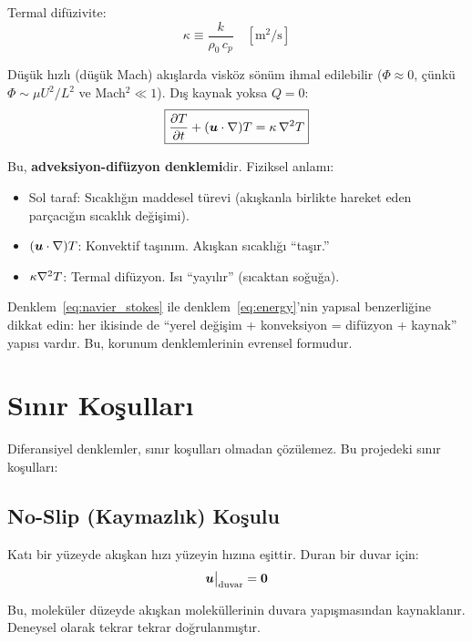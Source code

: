 Termal difüzivite:
\begin{equation}
    \kappa \equiv \frac{k}{\rho_0 \, c_p} \quad [\text{m}^2/\text{s}]
    \label{eq:thermal_diffusivity}
\end{equation}

Düşük hızlı (düşük Mach) akışlarda visköz sönüm ihmal edilebilir ($\Phi \approx 0$, çünkü $\Phi \sim \mu U^2/L^2$ ve Mach$^2 \ll 1$). Dış kaynak yoksa $Q = 0$:
\begin{equation}
    \boxed{\frac{\partial T}{\partial t} + (\bm{u}\cdot\nabla)T = \kappa\,\nabla^2 T}
    \label{eq:energy}
\end{equation}

Bu, \textbf{adveksiyon-difüzyon denklemi}dir. Fiziksel anlamı:
\begin{itemize}
    \item Sol taraf: Sıcaklığın maddesel türevi (akışkanla birlikte hareket eden parçacığın sıcaklık değişimi).
    \item $(\bm{u}\cdot\nabla)T$: Konvektif taşınım. Akışkan sıcaklığı ``taşır.''
    \item $\kappa\nabla^2 T$: Termal difüzyon. Isı ``yayılır'' (sıcaktan soğuğa).
\end{itemize}

Denklem~\eqref{eq:navier_stokes} ile denklem~\eqref{eq:energy}'nin yapısal benzerliğine dikkat edin: her ikisinde de ``yerel değişim + konveksiyon = difüzyon + kaynak'' yapısı vardır. Bu, korunum denklemlerinin evrensel formudur.


\section{Sınır Koşulları}
\label{sec:sinir_kosullari}

Diferansiyel denklemler, sınır koşulları olmadan çözülemez. Bu projedeki sınır koşulları:

\subsection{No-Slip (Kaymazlık) Koşulu}
Katı bir yüzeyde akışkan hızı yüzeyin hızına eşittir. Duran bir duvar için:
\begin{equation}
    \bm{u}\big|_{\text{duvar}} = \bm{0}
    \label{eq:no_slip}
\end{equation}

Bu, moleküler düzeyde akışkan moleküllerinin duvara yapışmasından kaynaklanır. Deneysel olarak tekrar tekrar doğrulanmıştır.

